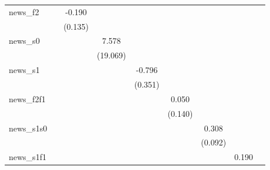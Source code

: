 {\begin{tabular}{l*{8}{c}}
\addlinespace
news\_f2     &                     &      -0.190         &                     &                     &                     &                     &                     &                     \\
            &                     &     (0.135)         &                     &                     &                     &                     &                     &                     \\
\addlinespace
news\_s0     &                     &                     &       7.578         &                     &                     &                     &                     &                     \\
            &                     &                     &    (19.069)         &                     &                     &                     &                     &                     \\
\addlinespace
news\_s1     &                     &                     &                     &      -0.796\sym{**} &                     &                     &                     &                     \\
            &                     &                     &                     &     (0.351)         &                     &                     &                     &                     \\
\addlinespace
news\_f2f1   &                     &                     &                     &                     &       0.050         &                     &                     &                     \\
            &                     &                     &                     &                     &     (0.140)         &                     &                     &                     \\
\addlinespace
news\_s1s0   &                     &                     &                     &                     &                     &       0.308\sym{***}&                     &                     \\
            &                     &                     &                     &                     &                     &     (0.092)         &                     &                     \\
\addlinespace
news\_s1f1   &                     &                     &                     &                     &                     &                     &       0.190         &                     \\

\end{tabular}}
